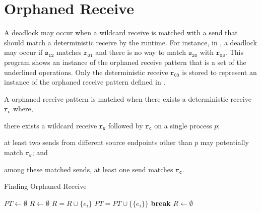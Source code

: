 \section{Orphaned Receive}


\examplefigone

A deadlock may occur when a wildcard receive is matched with a send that should match a deterministic receive by the runtime. For instance, in , a deadlock may occur if $\mathtt{s_{12}}$ matches $\mathtt{r_{01}}$ and there is no way to match $\mathtt{s_{20}}$ with $\mathtt{r_{03}}$. This program shows an instance of the orphaned receive pattern that is a set of the underlined operations. Only the deterministic receive $\mathtt{r_{03}}$ is stored to represent an instance of the orphaned receive pattern defined in .


\begin{definition}
A orphaned receive pattern is matched when there exists a deterministic receive $\mathtt{r_c}$ where, 
\begin{compactenum}
\item there exists a wildcard receive $\mathtt{r_w}$ followed by $\mathtt{r_c}$ on a single process $\mathit{p}$; 
\item at least two sends from different source endpoints other than $\mathit{p}$ may potentially match $\mathtt{r_w}$; and
\item among these matched sends, at least one send matches $\mathtt{r_c}$. 
\end{compactenum}
\label{def:mismatch}
\end{definition}


\begin{algorithm}
\caption{Finding Orphaned Receive}\label{algo:mismatch}
\begin{algorithmic}[1]
\State $\mathit{PT} \gets \emptyset$
\State $\mathit{R} \gets \emptyset$
\State $\mathit{R} = \mathit{R} \cup \{e_i\}$
\EndIf
{}
\State $\mathit{PT} = \mathit{PT} \cup \{\{e_i\}\}$
\State \textbf{break}
\EndIf
\EndFor
\EndIf
\EndFor
\State $\mathit{R} \gets \emptyset$
\EndFor
\end{algorithmic}
\end{algorithm}

